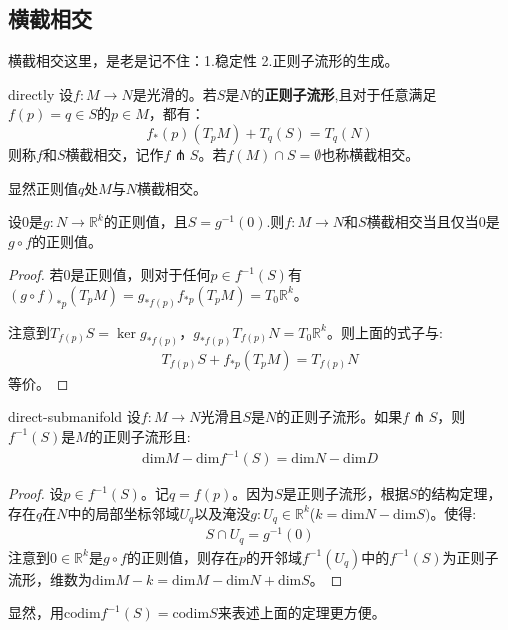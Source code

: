 \documentclass{package/fancy-book}
\newcommand{\R}{\mathbb{R}}
\begin{document}
\subsection{横截相交}
横截相交这里，是老是记不住：1.稳定性 2.正则子流形的生成。
\begin{definition}[横截相交]{directly}
    设$f:M \to N$是光滑的。若$S$是$N$的\textbf{正则子流形},且对于任意满足$f(p)=q \in S$的$p\in M$，都有：
    \begin{equation}
        f_*(p)(T_pM)+T_q(S)=T_q(N)
    \end{equation}
    则称$f$和$S$横截相交，记作$f \pitchfork S$。若$f(M)\cap S=\emptyset$也称横截相交。
\end{definition}
显然正则值$q$处$M$与$N$横截相交。
\begin{lemma}{}
    设$0$是$g:N \to \R^k$的正则值，且$S=g^{-1}(0)$.则$f:M \to N$和$S$横截相交当且仅当$0$是$g \circ f$的正则值。
\end{lemma}
\begin{proof}
    若$0$是正则值，则对于任何$p \in f^{-1}(S)$有$(g \circ f)_{*p}(T_pM)=g_{*f(p)}f_{*p}(T_p M)=T_0 \R^k$。

    注意到$T_{f(p)}S=\ker g_{*f(p)}$，$g_{*f(p)}T_{f(p)}N=T_0\R^k$。则上面的式子与:
    \begin{align}
        T_{f(p)}S+f_{*p}(T_p M)=T_{f(p)}N
    \end{align}
    等价。
\end{proof}
\begin{theorem}{direct-submanifold}
    设$f:M \to N$光滑且$S$是$N$的正则子流形。如果$f \pitchfork S$，则$f^{-1}(S)$是$M$的正则子流形且:
    \begin{align}
        \mathrm{dim}M-\mathrm{dim}f^{-1}(S)=\mathrm{dim}N-\mathrm{dim}D
    \end{align}
\end{theorem}
\begin{proof}
    设$p \in f^{-1}(S)$。记$q=f(p)$。因为$S$是正则子流形，根据$S$的结构定理，存在$q$在$N$中的局部坐标邻域$U_q$以及淹没$g:U_q \in \R^k$($k=\mathrm{dim}N-\mathrm{dim}S)$。使得:
    \begin{align}
        S \cap U_q=g^{-1}(0)
    \end{align}
    注意到$0 \in \R^k$是$g \circ f$的正则值，则存在$p$的开邻域$f^{-1}(U_q)$中的$f^{-1}(S)$为正则子流形，维数为$\mathrm{dim}M-k=\mathrm{dim}M-\mathrm{dim}N+\mathrm{dim}S$。
\end{proof}
显然，用$\mathrm{codim}f^{-1}(S)=\mathrm{codim}S$来表述上面的定理更方便。
\end{document}
